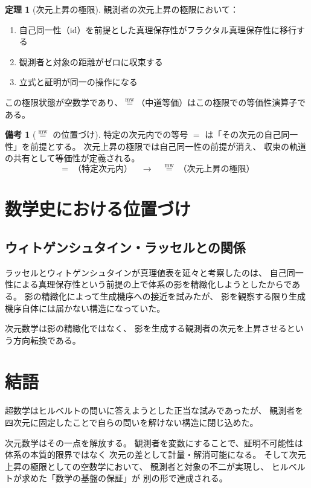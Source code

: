 \documentclass[11pt,a4paper]{article}
\newcommand{\mweq}{\mathrel{\overset{\mathrm{mw}}{=}}}
\theoremstyle{definition}
\newtheorem{theorem}{定理}[section]
\newtheorem{remark}{備考}[section]
\begin{document}
\begin{theorem}[次元上昇の極限]
観測者の次元上昇の極限において：
\begin{enumerate}
\item 自己同一性（id）を前提とした真理保存性がフラクタル真理保存性に移行する
\item 観測者と対象の距離がゼロに収束する
\item 立式と証明が同一の操作になる
\end{enumerate}
この極限状態が空数学であり、$\mweq$（中道等価）はこの極限での等価性演算子である。
\end{theorem}

\begin{remark}[$\mweq$ の位置づけ]
特定の次元内での等号 $=$ は「その次元の自己同一性」を前提とする。
次元上昇の極限では自己同一性の前提が消え、
収束の軌道の共有として等価性が定義される。
\[
= \;\text{（特定次元内）} \quad\longrightarrow\quad \mweq \;\text{（次元上昇の極限）}
\]
\end{remark}

\section{数学史における位置づけ}

\subsection{ウィトゲンシュタイン・ラッセルとの関係}

ラッセルとウィトゲンシュタインが真理値表を延々と考察したのは、
自己同一性による真理保存性という前提の上で体系の影を精緻化しようとしたからである。
影の精緻化によって生成機序への接近を試みたが、
影を観察する限り生成機序自体には届かない構造になっていた。

次元数学は影の精緻化ではなく、
影を生成する観測者の次元を上昇させるという方向転換である。

\section*{結語}

超数学はヒルベルトの問いに答えようとした正当な試みであったが、
観測者を四次元に固定したことで自らの問いを解けない構造に閉じ込めた。

次元数学はその一点を解放する。
観測者を変数にすることで、証明不可能性は体系の本質的限界ではなく
次元の差として計量・解消可能になる。
そして次元上昇の極限としての空数学において、
観測者と対象の不二が実現し、
ヒルベルトが求めた「数学の基盤の保証」が
別の形で達成される。
\end{document}
